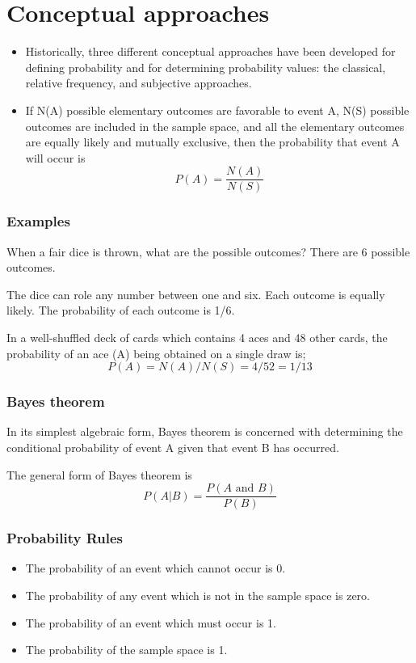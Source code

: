 \documentclass{beamer}
\begin{document}
\section*{Conceptual approaches}
\begin{frame}
\Large
\begin{itemize}
\item Historically, three different conceptual approaches have been developed for defining probability and for
determining probability values: the classical, relative frequency, and subjective approaches.\item If N(A) possible elementary outcomes are favorable to event A,
N(S) possible outcomes are included in the sample space, and all the elementary outcomes are equally likely and
mutually exclusive, then the probability that event A will occur is
\[P(A) = \frac{N(A)}{N(S)}\]
\end{itemize}
\end{frame}
\begin{frame} \frametitle{Examples}
\Large
When a fair dice is thrown, what are the possible outcomes? There are 6 possible outcomes. 

The dice can role any number between one and six. Each outcome is equally likely. The probability of each outcome is 1/6.
\end{frame}
\begin{frame} 

\Large
In a well-shuffled deck of cards which contains 4 aces and 48 other cards, the probability of an ace (A)
being obtained on a single draw is;
\[ P(A)= N(A)/ N(S) = 4/52 = 1/13 \]
\end{frame}
\begin{frame} 

\frametitle{Bayes theorem}
\Large
In its simplest algebraic form, Bayes theorem is concerned with determining the conditional probability of
event A given that event B has occurred. 

The general form of Bayes theorem is
\[ P(A|B) =
\frac{P(A \mbox{ and }B)}{P(B)} \]
\end{frame}
\begin{frame}
	\frametitle{Probability Rules}
	\begin{itemize}
		
		\item The probability of an event which cannot occur is 0.
		
		\item The probability of any event which is not in the sample space is zero.
		
		\item The probability of an event which must occur is 1.
		
		\item The probability of the sample space is 1.
	\end{itemize}
\end{frame}
\end{document}
